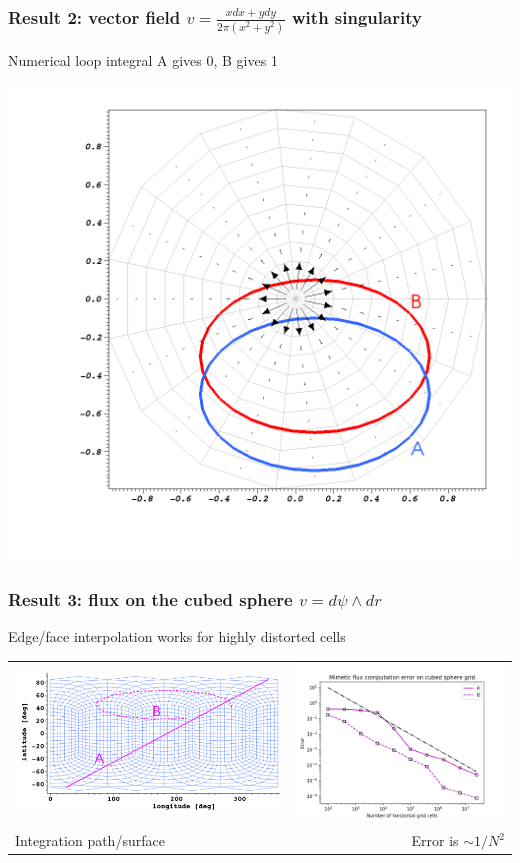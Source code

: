\documentclass[aspectratio=169]{beamer}
\begin{document}
\begin{frame}[t]
  \frametitle{Result 2: vector field $v = \frac{x dx + y dy}{2 \pi (x^2 + y^2)}$ with singularity}
  \begin{block}{Numerical loop integral A gives 0, B gives 1}
  \end{block}
  \begin{center}
    \includegraphics[width=.5\linewidth]{polar.png}
  \end{center}
\end{frame}

\begin{frame}[t]
  \frametitle{Result 3: flux on the cubed sphere $v = d\psi \wedge dr$}
  \begin{block}{Edge/face interpolation works for highly distorted cells}
  \end{block}
  
  \begin{tabular}{lr}
  \includegraphics[width=75mm]{fluxOnCubedSphere.png} & 
  \includegraphics[width=60mm]{cubedSphereFluxError.png} \\
  {Integration path/surface} & {Error is $\sim 1/N^2$} 
  \end{tabular}
\end{frame}
\end{document}
